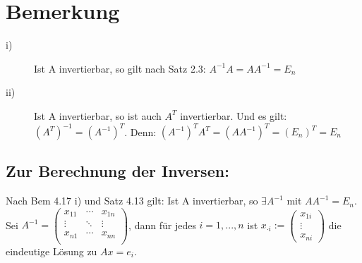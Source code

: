 \documentclass{scrbook}
\begin{document}
\section{Bemerkung}
\begin{description}
\item[i)] Ist A invertierbar, so gilt nach Satz 2.3: $A^{-1} A = A A^{-1} = E_n$
\item[ii)] Ist A invertierbar, so ist auch $A^T$ invertierbar. Und es gilt: $(A^T)^{-1} = (A^{-1})^T$. Denn: $(A^{-1})^T A^T = (A A^{-1})^T = (E_n)^T = E_n$
\end{description}
\subsection*{Zur Berechnung der Inversen:}
Nach Bem 4.17 i) und Satz 4.13 gilt: Ist A invertierbar, so $\exists A^{-1}$ mit $AA^{-1}= E_n$.\\ Sei $A^{-1} = \left( \begin{array}{ccc}
x_{11}&\cdots &x_{1n}\\
\vdots& \ddots & \vdots\\
x_{n1}&\cdots &x_{nn}\\
\end{array} \right)$, dann für jedes $i=1,...,n$ ist $x_{\cdot i}:=\left(\begin{array}{c}
x_{1i}\\ \vdots \\ x_{ni}
\end{array}\right)
$ die eindeutige Lösung zu $Ax=e_{i}$.
\end{document}
